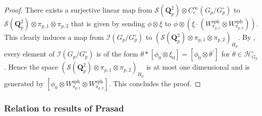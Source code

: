 \documentclass{amsart}%
\theoremstyle{plain}
\theoremstyle{plain}
\theoremstyle{remark}
\begin{document}
\begin{proof}
    There exists a surjective linear map from $\mathcal{S}(\mathbf{Q}_p^2)\otimes C_c^\infty(G_p/G_p^\circ)$ to $\mathcal{S}(\mathbf{Q}_p^2)\otimes \pi_{p,1}\otimes \pi_{p,2}$ that is given by sending $\phi\otimes \xi$ to $\phi\otimes\left(\xi\cdot (W_{\pi_{p,1}}^\mathrm{sph}\otimes W_{\pi_{p,2}}^\mathrm{sph})\right)$. This clearly induces a map from $\mathcal{I}(G_p/G_p^\circ)$ to $\left(\mathcal{S}(\mathbf{Q}_p^2)\otimes \pi_{p,1}\otimes \pi_{p,2}\right)_{H_p}$. By , every element of $\mathcal{I}(G_p/G_p^\circ)$ is of the form $\theta*[\phi_0\otimes \xi_0]=[\phi_0\otimes \theta^{'}]$ for $\theta\in\mathcal{H}_{G_p}^\circ$. Hence the space $\left(\mathcal{S}(\mathbf{Q}_p^2)\otimes \pi_{p,1}\otimes \pi_{p,2}\right)_{H_p}$ is at most one dimensional and is generated by $[\phi_0\otimes W_{\pi_{p,1}}^\mathrm{sph}\otimes W_{\pi_{p,2}}^\mathrm{sph}]$. This concludes the proof.
\end{proof}

\subsubsection{Relation to results of Prasad}
\end{document}
